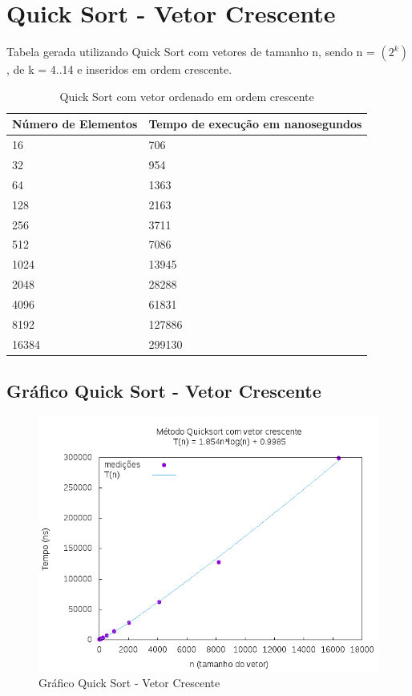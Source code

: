 \documentclass[12pt,a4paper,twoside]{report}
\begin{document}
\section{Quick Sort - Vetor Crescente}
Tabela gerada utilizando Quick Sort com vetores de tamanho n, sendo n = $(2^k)$, de k = 4..14 e inseridos em ordem crescente.
\begin{table}[H]
\centering
\caption{Quick Sort com vetor ordenado em ordem crescente}
\label{my-label}
\begin{tabular}{|l|l|}
\hline
\multicolumn{1}{|c|}{\textbf{Número de Elementos}} & \multicolumn{1}{c|}{\textbf{Tempo de execução em nanosegundos}} \\ \hline
16 & 706 \\ \hline
32 & 954 \\ \hline
64 & 1363 \\ \hline
128 & 2163 \\ \hline
256 & 3711 \\ \hline
512 & 7086 \\ \hline
1024 & 13945 \\ \hline
2048 & 28288 \\ \hline
4096 & 61831 \\ \hline
8192 & 127886 \\ \hline
16384 & 299130 \\ \hline
\end{tabular}
\end{table}

\subsection{Gráfico Quick Sort - Vetor Crescente}
\begin{figure}[H]
    \centering
    \includegraphics[width=0.7\linewidth]{graficos/QuickSort/vIntCrescente/vIntCrescente.png}
  \caption{Gráfico Quick Sort - Vetor Crescente}
\end{figure}
\end{document}
